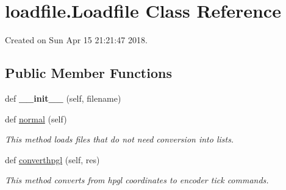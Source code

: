 \hypertarget{classloadfile_1_1Loadfile}{}\section{loadfile.\+Loadfile Class Reference}
\label{classloadfile_1_1Loadfile}


Created on Sun Apr 15 21\+:21\+:47 2018.  


\subsection*{Public Member Functions}
\begin{DoxyCompactItemize}
\item 
def {\bfseries \+\_\+\+\_\+init\+\_\+\+\_\+} (self, filename)\hypertarget{classloadfile_1_1Loadfile_af916caed5c6b620d5eee5821e5d2f305}{}\label{classloadfile_1_1Loadfile_af916caed5c6b620d5eee5821e5d2f305}

\item 
def \hyperlink{classloadfile_1_1Loadfile_afce50c9f03e7431ee836d587ce6a64e6}{normal} (self)\hypertarget{classloadfile_1_1Loadfile_afce50c9f03e7431ee836d587ce6a64e6}{}\label{classloadfile_1_1Loadfile_afce50c9f03e7431ee836d587ce6a64e6}

\begin{DoxyCompactList}\small\item\em This method loads files that do not need conversion into lists. \end{DoxyCompactList}\item 
def \hyperlink{classloadfile_1_1Loadfile_a4c0aa93f24108155b0e81ce5e8d55f3a}{converthpgl} (self, res)
\begin{DoxyCompactList}\small\item\em This method converts from hpgl coordinates to encoder tick commands. \end{DoxyCompactList}\end{DoxyCompactItemize}
